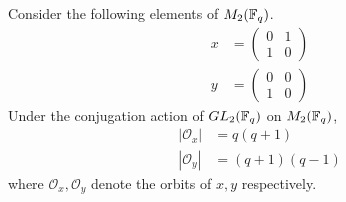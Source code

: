 \documentclass{amsart}
\begin{document}
\begin{lemma}\label{orbit-sizes}
    Consider the following elements of $M_2(\protect\mathbb{F}_q)$.
    \begin{align*}
        x &= 
        \begin{pmatrix}
            0 & 1 \\
            1 & 0
        \end{pmatrix} \\
        y &=
        \begin{pmatrix}
            0 & 0 \\
            1 & 0
        \end{pmatrix}
    \end{align*}
    Under the conjugation action of $GL_2(\protect\mathbb{F}_q)$ on $M_2(\protect\mathbb{F}_q)$, 
    \begin{align*}
        |\mathcal{O}_x| &= q(q + 1) \\
        |\mathcal{O}_y| &= (q + 1)(q - 1)
    \end{align*}
    where $\mathcal{O}_x, \mathcal{O}_y$ denote the orbits of $x, y$ respectively.
\end{lemma}
\end{document}
